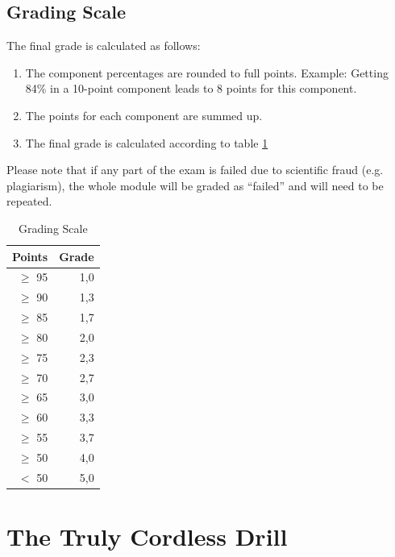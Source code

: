 \documentclass[headinclude=true]{scrartcl}
\begin{document}
\subsection{Grading Scale}

The final grade is calculated as follows:

\begin{enumerate}
 \item The component percentages are rounded to full points. Example: Getting 84\% in a 10-point component leads to 8 points for this component.
 \item The points for each component are summed up.
 \item The final grade is calculated according to table \ref{tab:notenskala}
\end{enumerate}

Please note that if any part of the exam is failed due to scientific fraud (e.g. plagiarism), the whole module will be graded as ``failed'' and will need to be repeated.

\begin{table} \centering
 \caption{Grading Scale}
 \label{tab:notenskala}
 \begin{tabular}{rr}
  \toprule
  Points & Grade \\ \midrule
  $\geq$ 95 & 1,0 \\
  $\geq$ 90 & 1,3 \\
  $\geq$ 85 & 1,7 \\
  $\geq$ 80 & 2,0 \\
  $\geq$ 75 & 2,3 \\
  $\geq$ 70 & 2,7 \\
  $\geq$ 65 & 3,0 \\
  $\geq$ 60 & 3,3 \\
  $\geq$ 55 & 3,7 \\
  $\geq$ 50 & 4,0 \\
  $<$ 50 & 5,0 \\ \bottomrule
 \end{tabular}
\end{table}

\section{The Truly Cordless Drill}
\label{chap:projektaufgabe}
\end{document}
